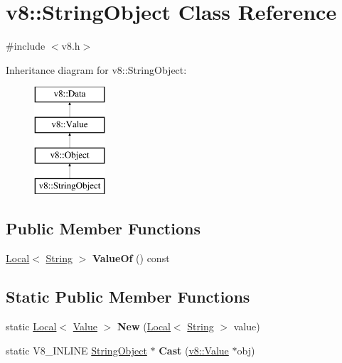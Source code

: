 \hypertarget{classv8_1_1_string_object}{}\section{v8\+:\+:String\+Object Class Reference}
\label{classv8_1_1_string_object}


{\ttfamily \#include $<$v8.\+h$>$}

Inheritance diagram for v8\+:\+:String\+Object\+:\begin{figure}[H]
\begin{center}
\leavevmode
\includegraphics[height=4.000000cm]{classv8_1_1_string_object}
\end{center}
\end{figure}
\subsection*{Public Member Functions}
\begin{DoxyCompactItemize}
\item 
\hyperlink{classv8_1_1_local}{Local}$<$ \hyperlink{classv8_1_1_string}{String} $>$ {\bfseries Value\+Of} () const \hypertarget{classv8_1_1_string_object_af18e2096a2298d188b2acb18c0c8e81d}{}\label{classv8_1_1_string_object_af18e2096a2298d188b2acb18c0c8e81d}

\end{DoxyCompactItemize}
\subsection*{Static Public Member Functions}
\begin{DoxyCompactItemize}
\item 
static \hyperlink{classv8_1_1_local}{Local}$<$ \hyperlink{classv8_1_1_value}{Value} $>$ {\bfseries New} (\hyperlink{classv8_1_1_local}{Local}$<$ \hyperlink{classv8_1_1_string}{String} $>$ value)\hypertarget{classv8_1_1_string_object_ae1e3638452823d6131eeb619838f39f8}{}\label{classv8_1_1_string_object_ae1e3638452823d6131eeb619838f39f8}

\item 
static V8\+\_\+\+I\+N\+L\+I\+NE \hyperlink{classv8_1_1_string_object}{String\+Object} $\ast$ {\bfseries Cast} (\hyperlink{classv8_1_1_value}{v8\+::\+Value} $\ast$obj)\hypertarget{classv8_1_1_string_object_af2169f0b4c890196416e4d28fbf76df8}{}\label{classv8_1_1_string_object_af2169f0b4c890196416e4d28fbf76df8}

\end{DoxyCompactItemize}
